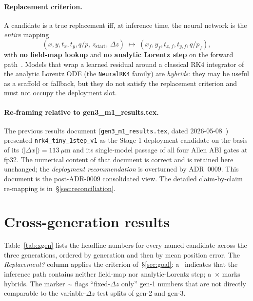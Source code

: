 \documentclass[11pt,a4paper]{article}
\begin{document}
\paragraph{Replacement criterion.} A candidate is a true replacement
iff, at inference time, the neural network is the \emph{entire}
mapping
\[
  (x, y, t_x, t_y, q/p,\, z_{\mathrm{start}},\, \Delta z)
  \;\longmapsto\;
  (x_f, y_f, t_{x,f}, t_{y,f}, q/p_f),
\]
with \textbf{no field-map lookup} and \textbf{no analytic Lorentz
step} on the forward path~\cite{replacementplan, adr0009}. Models
that wrap a learned residual around a classical RK4 integrator of the
analytic Lorentz ODE (the \texttt{NeuralRK4} family) are
\emph{hybrids}: they may be useful as a scaffold or fallback, but they
do not satisfy the replacement criterion and must not occupy the
deployment slot.

\paragraph{Re-framing relative to gen3\_m1\_results.tex.} The previous
results document (\texttt{gen3\_m1\_results.tex}, dated
2026-05-08~\cite{gen3m1}) presented \texttt{nrk4\_tiny\_1step\_v1} as
the Stage-1 deployment candidate on the basis of its
$\langle|\Delta x|\rangle = 113~\mu$m and its single-model passage of
all four Allen ABI gates at fp32. The numerical content of that
document is correct and is retained here unchanged; the
\emph{deployment recommendation} is overturned by ADR~0009. This
document is the post-ADR-0009 consolidated view. The detailed
claim-by-claim re-mapping is in~\S\ref{sec:reconciliation}.

\section{Cross-generation results}\label{sec:xgen}

Table~\ref{tab:xgen} lists the headline numbers for every named
candidate across the three generations, ordered by generation and then
by mean position error. The \emph{Replacement?} column applies the
criterion of~\S\ref{sec:goal}: a~\checkmark{} indicates that the
inference path contains neither field-map nor analytic-Lorentz step;
a~$\times$ marks hybrids. The marker $\sim$ flags ``fixed-$\Delta z$
only'' gen-1 numbers that are not directly comparable to the
variable-$\Delta z$ test splits of gen-2 and gen-3.
\end{document}
